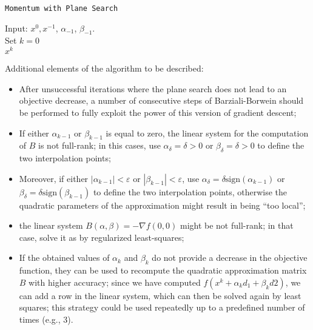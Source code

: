 \documentclass[a4paper, 11pt, openany]{article}
\theoremstyle{plain}%
\theoremstyle{definition}
\begin{document}
	\begin{algorithm}[htbp]
			\SetAlCapHSkip{0.22cm}
			\caption{\texttt{Momentum with Plane Search}}
			\SetInd{0.1cm}{0.5cm}
			\SetVlineSkip{0.1cm}
			\SetNlSkip{0.2cm}
			
			
			\label{alg:PGLS}
			Input: $x^0,x^{-1}$, $\alpha_{-1}$, $\beta_{-1}$.\\
			Set $k=0$\\	
			\Return $x^k$
	\end{algorithm}


Additional elements of the algorithm to be described:
\begin{itemize}
	\item After unsuccessful iterations where the plane search does not lead to an objective decrease, a number of consecutive steps of Barziali-Borwein should be performed to fully exploit the power of this version of gradient descent; 
	\item If either $\alpha_{k-1}$ or $\beta_{k-1}$ is equal to zero, the linear system for the computation of $B$ is not full-rank; in this cases, use $\alpha_\delta= \delta >0$ or $\beta_\delta = \delta >0$ to define the two interpolation points;
	\item Moreover, if either $|\alpha_{k-1}|<\varepsilon$ or $|\beta_{k-1}|<\varepsilon$, use $\alpha_\delta= \delta\text{sign}(\alpha_{k-1})$ or $\beta_\delta = \delta\text{sign}(\beta_{k-1})$ to define the two interpolation points, otherwise the quadratic parameters of the approximation might result in being ``too local'';
	\item the linear system $B(\alpha,\beta) = -\nabla f(0,0)$ might be not full-rank; in that case, solve it as by regularized least-squares;
	\item If the obtained values of $\alpha_k$ and $\beta_k$ do not provide a decrease in the objective function, they can be used to recompute the quadratic approximation matrix $B$ with higher accuracy; since we have computed $f(x^k+\alpha_kd_1+\beta_kd2)$, we can add a row in the linear system, which can then be solved again by least squares; this strategy could be used repeatedly up to a predefined number of times (e.g., 3).
\end{itemize}	
\end{document}
